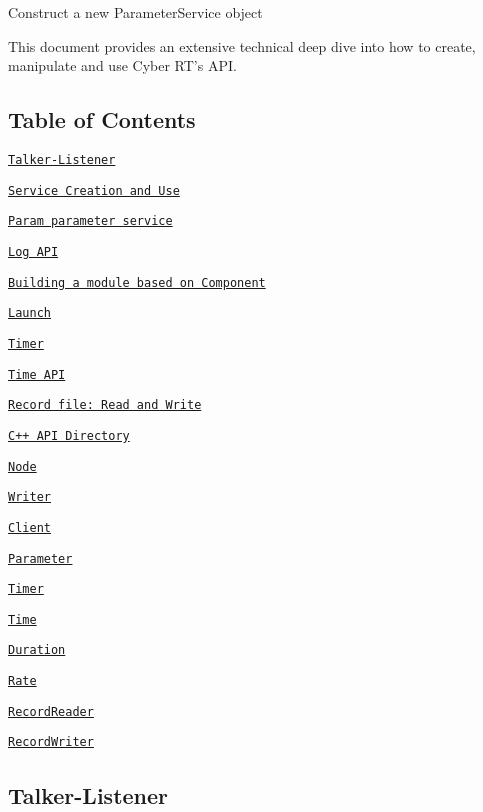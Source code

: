 Construct a new Parameter\-Service object

This document provides an extensive technical deep dive into how to create, manipulate and use Cyber R\-T's A\-P\-I.

\subsection*{Table of Contents}


\begin{DoxyItemize}
\item \href{#Talker-Listener}{\tt Talker-\/\-Listener}
\item \href{#Service-Creation-and-Use}{\tt Service Creation and Use}
\item \href{#Param-parameter-service}{\tt Param parameter service}
\item \href{#LOG-API}{\tt Log A\-P\-I}
\item \href{#Building-a-module-based-on-Component}{\tt Building a module based on Component}
\item \href{#Launch}{\tt Launch}
\item \href{#timer}{\tt Timer}
\item \href{#use-of-time}{\tt Time A\-P\-I}
\item \href{#Record-file-Read-and-Write}{\tt Record file\-: Read and Write}
\item \href{##API-Directory}{\tt C++ A\-P\-I Directory}
\begin{DoxyItemize}
\item \href{#node-api}{\tt Node}
\item \href{#writer-api}{\tt Writer}
\item \href{#client-api}{\tt Client}
\item \href{#parameter-api}{\tt Parameter}
\item \href{#timer-api}{\tt Timer}
\item \href{#timer-api}{\tt Time}
\item \href{#duration-api}{\tt Duration}
\item \href{#rate-api}{\tt Rate}
\item \href{#recordreader-api}{\tt Record\-Reader}
\item \href{#recordwriter-api}{\tt Record\-Writer}
\end{DoxyItemize}
\end{DoxyItemize}

\subsection*{Talker-\/\-Listener}

